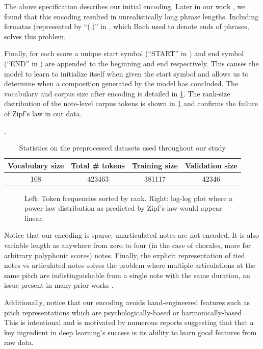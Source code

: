 The above specification describes our initial encoding. Later in our work
, we found that this encoding resulted in unrealistically long
phrase lengths. Including fermatas (represented by ``(.)'' in , which Bach used to denote ends of phrases, solves this problem.

Finally, for each score a unique start symbol (``START'' in )
and end symbol (``END'' in ) are appended to the beginning and
end respectively. This causes the model to learn to initialize itself when
given the start symbol and allows us to determine when a composition generated
by the model has concluded. The vocabulary and corpus size after encoding is
detailed in \cref{tab:encoded-corpus-stats}. The rank-size distribution of the
note-level corpus tokens is shown in \cref{fig:zipf} and confirms the failure
of Zipf's law in our data.

\begin{table}[tb]
  \centering
  \caption{Statistics on the preprocessed datasets used throughout our study}
  \label{tab:encoded-corpus-stats}.
  \begin{tabular}{c c c c}
    \toprule
    Vocabulary size & Total \# tokens & Training size & Validation size \\
    \midrule
    108 & 423463 & 381117 & 42346 \\
    \bottomrule
  \end{tabular}
\end{table}

\begin{figure}[tb]
  \centering
  
  \caption{Left: Token frequencies sorted by rank. Right: log-log plot where
  a power law distribution as predicted by Zipf's law would appear linear.}
  \label{fig:zipf}
\end{figure}

Notice that our encoding is sparse: unarticulated notes are not encoded. It is
also variable length as anywhere from zero to four (in the case of chorales,
more for arbitrary polyphonic scores) notes. Finally, the explicit
representation of tied notes vs articulated notes solves the problem where
multiple articulations at the same pitch are indistinguishable from a single
note with the same duration, an issue present in many prior works
\citep{Eck2002,eck2008learning,Liu2014,Brien2016}.

Additionally, notice that our encoding avoids hand-engineered features such as
pitch representations which are psychologically-based \citep{mozer1994neural}
or harmonically-based \citep{franklin2004recurrent}
\citep{laden1989representation}. This is intentional and is motivated by
numerous reports \citep{bengio2009learning}\citep{Bengio2011} suggesting that
that a key ingredient in deep learning's success is its ability to learn good
features from raw data.

